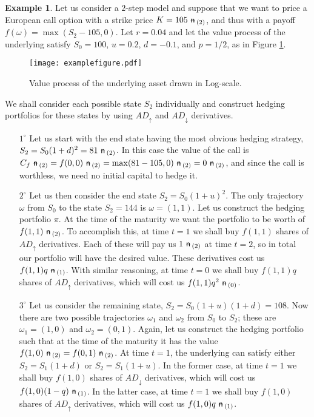 \documentclass{amsart}
\theoremstyle{definition}
\newtheorem{example}[theorem]{Example}
\theoremstyle{remark}
\newcommand{\n}{\!\!\ \nn \!\!\ }
\def\nn{\mathrel{%
    \mathchoice{\n}{\n}{\scriptsize\n}{\tiny\n}%
}}
\def\n {{%
    \setbox0\hbox{ \textsf{n}\!\  }%
    \rlap{\hbox to \wd0{\hss \!\ --\hss}}\box0
}}
\numberwithin{equation}{section}
\newcommand{\1}{\boldsymbol{1}}
\newcommand{\ua}{\uparrow}
\newcommand{\da}{\downarrow}
\begin{document}
\begin{example}\label{example: }
Let us consider a $2$-step model and suppose that we want to price a European call option with a strike price $K=105\n_{(2)}$, and thus with a payoff $f(\omega)=\max(S_2-105,0)$. Let $r=0.04$ and let the value process of the underlying satisfy $S_0=100$, $u=0.2$, $d=-0.1$, and $p=1/2$, as in Figure \ref{figure:example}.


\begin{figure}[h!]
\begin{center}
\texttt{[image: examplefigure.pdf]}
\caption{Value process of the underlying asset drawn in Log-scale.}
\label{figure:example}
\end{center}
\end{figure}



We shall consider each possible state $S_2$ individually and construct  hedging portfolios for these states by using $AD_\ua$ and $AD_\da$ derivatives.

\begin{itemize}
\item [$1^\circ$] Let us start with the end state having the most obvious hedging strategy, $S_2=S_0(1+d)^2=81\n_{(2)}$. In this case the value of the call is $C_f\n_{(2)}=f(0,0)\n_{(2)}=\max(81-105,0)\n_{(2)}=0 \n_{(2)}$, and since the call is worthless, we need no initial capital to hedge it.

\item [$2^\circ$] Let us then consider the end state $S_2=S_0(1+u)^2$. The only trajectory $\omega$ from $S_0$ to the state $S_2 =144$ is $\omega=(1,1)$. Let us construct the hedging portfolio $\pi$. At the time of the maturity  we want the portfolio to be worth of $f(1,1)\n_{(2)}$. To accomplish this, at time $t=1$ we shall buy $f(1,1)$ shares of $AD_\ua$ derivatives. Each of these will pay us $1\n_{(2)}$ at time $t=2$, so in total our portfolio will have the desired value. These derivatives cost us $f(1,1)q\n_{(1)}$. With similar reasoning, at time $t=0$ we shall buy $f(1,1)q$ shares of $AD_\ua$ derivatives, which will cost us $f(1,1)q^2\n_{(0)}$.

\item [$3^\circ$] Let us consider the remaining state, $S_2=S_0(1+u)(1+d)=108$. Now there are two possible trajectories $\omega_1$ and $\omega_2$ from $S_0$ to $S_2$; these are $\omega_1=(1,0)$ and $\omega_2=(0,1)$. Again, let us construct the hedging portfolio such that at the time of the maturity it has the value $f(1,0)\n_{(2)}=f(0,1)\n_{(2)}$. At time $t=1$, the underlying can satisfy either $S_2=S_1(1+d)$ or $S_2=S_1(1+u)$. In the former case, at time $t=1$ we shall buy $f(1,0)$ shares of $AD_\da$ derivatives, which will cost us $f(1,0)(1-q)\n_{(1)}$. In the latter case, at time $t=1$ we shall buy $f(1,0)$ shares of $AD_\ua$ derivatives, which will cost us $f(1,0)q\n_{(1)}$. 


\end{itemize}
\end{example}
\end{document}

